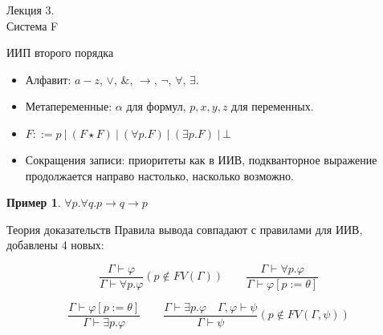 \documentclass[aspectratio=169]{beamer}
\begin{document}
\newtheorem{dfn}{Определение}[section]
\newtheorem{nte}{Замечание}[section]

\newtheorem{axiom}{Аксиома}[section]
\newtheorem{thm}{Теорема}[section]
\newtheorem{lmm}[theorem]{Лемма}
\newtheorem{statement}{Утверждение}[section]
\newtheorem{oun_paragraph}{Пункт}[section]
\newtheorem{cons}{Следствие}[section]
\newtheorem*{exm}{Пример}

\newcommand{\comb}[1]{\operatorname{\bf{\textrm{#1}}}}
\newcommand{\func}[1]{\operatorname{#1}}
\newcommand{\reduction}[1]{{\color{OrangeRed}#1}}
\newcommand{\set}[1]{\left\{#1\right\}}

\def\from#1{\par \parbox{0.7\textwidth}{\par \hfill\raggedleft \it #1}} 

\begin{frame}{}
\begin{center}\Large Лекция 3.\\ \Large Система F\end{center}
\end{frame}

\begin{frame}{ИИП второго порядка}
\begin{itemize}
\item Алфавит: $a-z$, $\vee$, $\&$, $\rightarrow$, $\neg$, $\forall$, $\exists$.
\item Метапеременные: $\alpha$ для формул, $p,x,y,z$ для переменных.
\item $F ::= p\ |\ (F\star F)\ |\ (\forall p.F)\ |\ (\exists p.F)\ |\ \bot$
\item Сокращения записи: приоритеты как в ИИВ, подкванторное выражение продолжается направо настолько, насколько возможно.
\end{itemize}

\begin{exm}
$\forall p.\forall q.p \rightarrow q \rightarrow p$
\end{exm}
\end{frame}

\begin{frame}{Теория доказательств}
    Правила вывода совпадают с правилами для ИИВ, добавлены 4 новых:

    \[ \dfrac{\Gamma\vdash\varphi}{\Gamma\vdash\forall p.\varphi} (p\notin FV(\Gamma)) \qquad
        \dfrac{\Gamma\vdash\forall p.\varphi}{\Gamma\vdash\varphi[p:=\theta]} \]


    \[ \dfrac{\Gamma\vdash\varphi[p := \theta]}{\Gamma\vdash\exists p.\varphi} \qquad
       \dfrac{\Gamma\vdash\exists p.\varphi\quad\Gamma,\varphi\vdash\psi}{\Gamma\vdash\psi} (p \notin FV(\Gamma,\psi)) \]
\end{frame}
\end{document}
